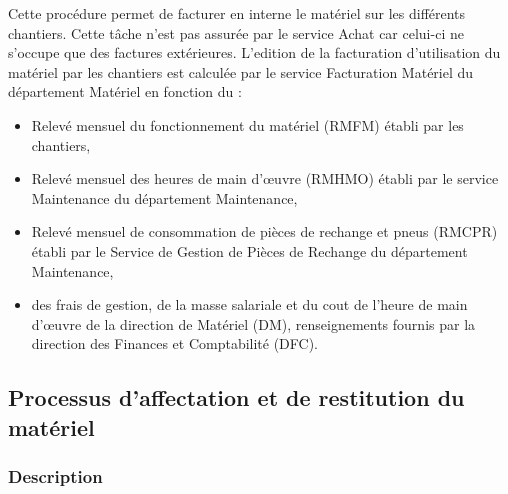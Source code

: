 				Cette procédure permet de facturer en interne le matériel sur les différents chantiers. Cette tâche n'est pas assurée par le service Achat car celui-ci ne s'occupe que des factures extérieures.
				\newline
				L'edition de la facturation d'utilisation du matériel par les chantiers est calculée par le service
Facturation Matériel du département Matériel en fonction du :
				\begin{itemize}
						    \item Relevé mensuel du fonctionnement du matériel (RMFM) établi par les chantiers,
						    \item Relevé mensuel des heures de main d'œuvre (RMHMO) établi par le service Maintenance
du département Maintenance,
						    \item Relevé mensuel de consommation de pièces de rechange et pneus (RMCPR) établi par le Service de Gestion de Pièces de Rechange du département Maintenance,
						    \item des frais de gestion, de la masse salariale et du cout de l'heure de main d'œuvre de la
direction de Matériel (DM), renseignements fournis par la direction des Finances et Comptabilité (DFC).
				\end{itemize}
				
				
				

		\subsection{Processus d'affectation et de restitution du matériel}
				\subsubsection{Description}
				
